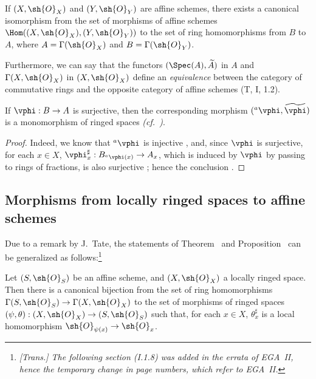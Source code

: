 \begin{corollary}[1.7.4]
\label{I.1.7.4}
If $(X,\sh{O}_X)$ and $(Y,\sh{O}_Y)$ are affine schemes, there exists a canonical isomorphism from the set of morphisms of affine schemes $\Hom((X,\sh{O}_X),(Y,\sh{O}_Y))$ to the set of ring homomorphisms from $B$ to $A$, where $A=\Gamma(\sh{O}_X)$ and $B=\Gamma(\sh{O}_Y)$.
\end{corollary}

Furthermore, we can say that the functors $(\Spec(A),\widetilde{A})$ in $A$ and $\Gamma(X,\sh{O}_X)$ in $(X,\sh{O}_X)$ define an \emph{equivalence} between the category of commutative rings and the opposite category of affine schemes (T, I, 1.2).

\begin{corollary}[1.7.5]
\label{I.1.7.5}
If $\vphi:B\to A$ is surjective, then the corresponding morphism $({}^a\vphi,\widetilde{\vphi})$ is a monomorphism of ringed spaces \emph{(cf.~)}.
\end{corollary}

\begin{proof}
Indeed, we know that ${}^a\vphi$ is injective , and, since $\vphi$ is
surjective, for each $x\in X$, $\vphi_x^\sharp:B_{{}^a\vphi(x)}\to A_x$, which is induced by $\vphi$ by passing to rings of fractions, is also surjective ;
hence the conclusion .
\end{proof}

\subsection{Morphisms from locally ringed spaces to affine schemes}
\label{subsection:I.1.8}

Due to a remark by J.~Tate, the statements of Theorem~ and Proposition~ can be generalized as follows:\footnote{\emph{[Trans.] The following section (I.1.8) was added in the errata of EGA~II, hence the temporary change in page numbers, which refer to EGA~II.}}

\begin{proposition}[1.8.1]
\label{I.1.8.1}
Let $(S,\sh{O}_S)$ be an affine scheme, and $(X,\sh{O}_X)$ a locally ringed space.
Then there is a canonical bijection from the set of ring homomorphisms
$\Gamma(S,\sh{O}_S)\to\Gamma(X,\sh{O}_X)$ to the set of morphisms of ringed spaces $(\psi,\theta):(X,\sh{O}_X)\to(S,\sh{O}_S)$ such that, for each $x\in X$, $\theta_x^\sharp$ is a local homomorphism $\sh{O}_{\psi(x)}\to\sh{O}_x$.
\end{proposition}

